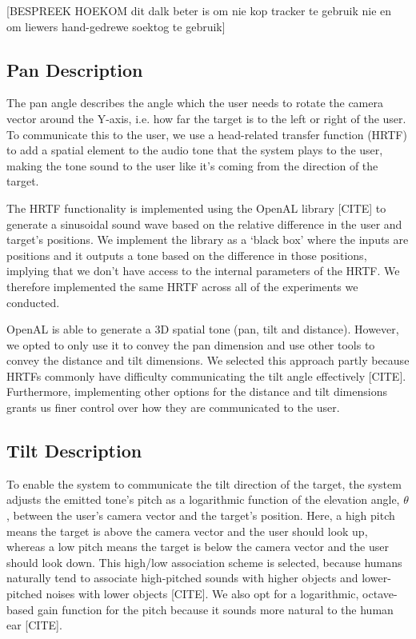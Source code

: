 \documentclass[format=sigconf, review=true, screen=true, anonymous=true]{acmart}
\begin{document}
[BESPREEK HOEKOM dit dalk beter is om nie kop tracker te gebruik nie en om liewers hand-gedrewe soektog te gebruik]

\subsection{Pan Description}

The pan angle describes the angle which the user needs to rotate the camera vector around the Y-axis, i.e. how far the target is to the left or right of the user. To communicate this to the user, we use a head-related transfer function (HRTF) to add a spatial element to the audio tone that the system plays to the user, making the tone sound to the user like it's coming from the direction of the target. 

The HRTF functionality is implemented using the OpenAL library [CITE] to generate a sinusoidal sound wave based on the relative difference in the user and target's positions. We implement the library as a `black box' where the inputs are positions and it outputs a tone based on the difference in those positions, implying that we don't have access to the internal parameters of the HRTF. We therefore implemented the same HRTF across all of the experiments we conducted.  

OpenAL is able to generate a 3D spatial tone (pan, tilt and distance). However, we opted to only use it to convey the pan dimension and use other tools to convey the distance and tilt dimensions. We selected this approach partly because HRTFs commonly have difficulty communicating the tilt angle effectively [CITE]. Furthermore, implementing other options for the distance and tilt dimensions grants us finer control over how they are communicated to the user.

\subsection{Tilt Description}

To enable the system to communicate the tilt direction of the target, the system adjusts the emitted tone's pitch as a logarithmic function of the elevation angle, $\theta$, between the user's camera vector and the target's position. Here, a high pitch means the target is above the camera vector and the user should look up, whereas a low pitch means the target is below the camera vector and the user should look down. This high/low association scheme is selected, because humans naturally tend to associate high-pitched sounds with higher objects and lower-pitched noises with lower objects [CITE]. We also opt for a logarithmic, octave-based gain function for the pitch because it sounds more natural to the human ear [CITE].
\end{document}
